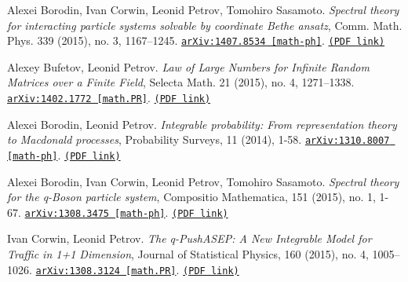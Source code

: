 \documentclass[letterpaper,11pt]{article}
\begin{document}
\begin{etaremune}
\item 
Alexei Borodin, Ivan Corwin, Leonid Petrov, Tomohiro Sasamoto.
\emph{Spectral theory for interacting particle systems solvable by coordinate Bethe ansatz}, Comm. Math. Phys. 339 (2015), no. 3, 1167–1245. 
\href{https://arxiv.org/abs/1407.8534}{\texttt{arXiv:1407.8534 [math-ph]}}. \href{https://storage.lpetrov.cc/research_files/Petrov-publ/17-publ-petrov-uva.pdf}{\texttt{(PDF link)}}





\item 
Alexey Bufetov, Leonid Petrov.
\emph{Law of Large Numbers for Infinite Random Matrices over a Finite Field}, Selecta Math. 21 (2015), no. 4, 1271–1338. 
\href{https://arxiv.org/abs/1402.1772}{\texttt{arXiv:1402.1772 [math.PR]}}. \href{https://storage.lpetrov.cc/research_files/Petrov-publ/16-publ-petrov.pdf}{\texttt{(PDF link)}}













\item 
Alexei Borodin, Leonid Petrov.
\emph{Integrable probability: From representation theory to Macdonald processes}, Probability Surveys, 11 (2014), 1-58. 
\href{https://arxiv.org/abs/1310.8007}{\texttt{arXiv:1310.8007 [math-ph]}}. \href{https://storage.lpetrov.cc/research_files/Petrov-publ/15-publ-petrov.pdf}{\texttt{(PDF link)}}





\item 
Alexei Borodin, Ivan Corwin, Leonid Petrov, Tomohiro Sasamoto.
\emph{Spectral theory for the q-Boson particle system}, Compositio Mathematica, 151 (2015), no. 1, 1-67. 
\href{https://arxiv.org/abs/1308.3475}{\texttt{arXiv:1308.3475 [math-ph]}}. \href{https://storage.lpetrov.cc/research_files/Petrov-publ/14-publ-petrov.pdf}{\texttt{(PDF link)}}



\item 
Ivan Corwin, Leonid Petrov.
\emph{The q-PushASEP: A New Integrable Model for Traffic in 1+1 Dimension}, Journal of Statistical Physics, 160 (2015), no. 4, 1005–1026. 
\href{https://arxiv.org/abs/1308.3124}{\texttt{arXiv:1308.3124 [math.PR]}}. \href{https://storage.lpetrov.cc/research_files/Petrov-publ/13-publ-petrov.pdf}{\texttt{(PDF link)}}






\end{etaremune}
\end{document}
